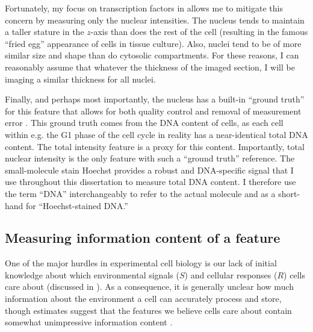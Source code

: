Fortunately, my focus on transcription factors in 
 allows me to mitigate this concern
by measuring only the nuclear intensities. The nucleus
tends to maintain a taller stature in the $z$-axis than does
the rest of the cell (resulting in the famous ``fried egg'' appearance
of cells in tissue culture). Also, nuclei tend to be of
more similar size and shape than do cytosolic compartments.
For these reasons, I can reasonably assume that whatever the
thickness of the imaged section, I will be imaging a similar
thickness for all nuclei.


Finally, and perhaps most importantly, the nucleus
has a built-in ``ground truth'' for this feature that allows
for both quality control and removal of measurement error
.
This ground truth comes from the DNA content of cells, as
each cell within e.g. the G1 phase of the cell cycle in reality
has a near-identical total DNA content. The total intensity
feature is a proxy for this content. Importantly,
total nuclear intensity is the only feature
with such a ``ground truth'' reference.
The small-molecule stain Hoechst
provides a robust and DNA-specific signal that I use throughout
this dissertation to measure total DNA content. I therefore use
the term ``DNA'' interchangeably to refer to the actual molecule
and as a short-hand for ``Hoechst-stained DNA.'' 


\subsection{Measuring information content of a feature}
\label{imaging:information}

One of the major hurdles in experimental cell biology
is our lack of initial knowledge about which environmental
signals ($S$) and cellular responses ($R$) cells care about
(discussed in ).
As a consequence, it is generally unclear how
much information about the environment a cell can accurately process
and store, though estimates suggest that the features
we believe cells care about contain
somewhat unimpressive information content \cite{Cheong2011}.

